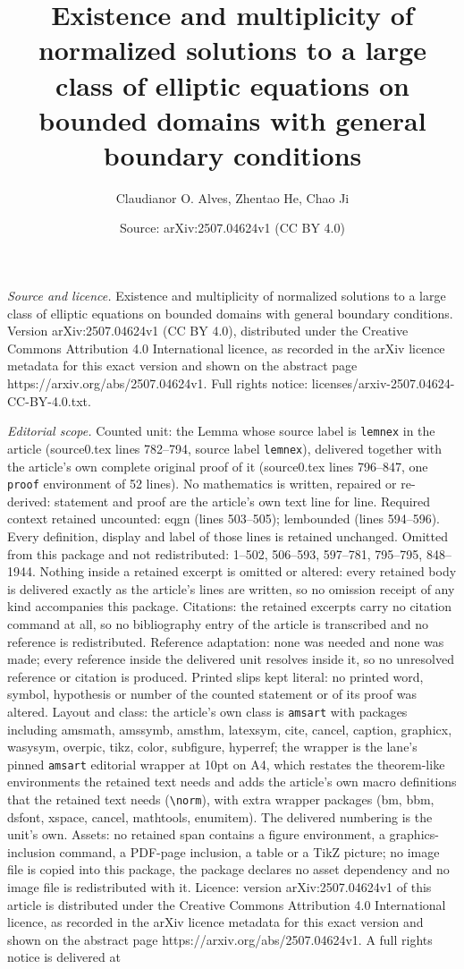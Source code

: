 \documentclass[10pt,a4paper]{amsart}
\title[Existence and multiplicity of normalized solutions to a larg]{Existence and multiplicity of normalized solutions to a large class of elliptic equations on bounded domains with general boundary conditions}
\author{Claudianor O. Alves, Zhentao He, Chao Ji}
\date{Source: arXiv:2507.04624v1 (CC BY 4.0)}
\begin{document}
\maketitle

\noindent\emph{Source and licence.} Existence and multiplicity of normalized solutions to a large class of elliptic equations on bounded domains with general boundary conditions. Version arXiv:2507.04624v1 (CC BY 4.0), distributed under the Creative Commons Attribution 4.0 International licence, as recorded in the arXiv licence metadata for this exact version and shown on the abstract page https://arxiv.org/abs/2507.04624v1. Full rights notice: licenses/arxiv-2507.04624-CC-BY-4.0.txt.\par\smallskip

\noindent\textit{Editorial scope.} Counted unit: the Lemma whose source label is \texttt{lemnex} in the article (source0.tex lines 782--794, source label \texttt{lemnex}), delivered together with the article's own complete original proof of it (source0.tex lines 796--847, one \texttt{proof} environment of 52 lines). No mathematics is written, repaired or re-derived: statement and proof are the article's own text line for line. Required context retained uncounted: eqgn (lines 503--505); lembounded (lines 594--596). Every definition, display and label of those lines is retained unchanged. Omitted from this package and not redistributed: 1--502, 506--593, 597--781, 795--795, 848--1944. Nothing inside a retained excerpt is omitted or altered: every retained body is delivered exactly as the article's lines are written, so no omission receipt of any kind accompanies this package. Citations: the retained excerpts carry no citation command at all, so no bibliography entry of the article is transcribed and no reference is redistributed. Reference adaptation: none was needed and none was made; every reference inside the delivered unit resolves inside it, so no unresolved reference or citation is produced. Printed slips kept literal: no printed word, symbol, hypothesis or number of the counted statement or of its proof was altered. Layout and class: the article's own class is \texttt{amsart} with packages including amsmath, amssymb, amsthm, latexsym, cite, cancel, caption, graphicx, wasysym, overpic, tikz, color, subfigure, hyperref; the wrapper is the lane's pinned \texttt{amsart} editorial wrapper at 10pt on A4, which restates the theorem-like environments the retained text needs and adds the article's own macro definitions that the retained text needs (\texttt{\textbackslash norm}), with extra wrapper packages (bm, bbm, dsfont, xspace, cancel, mathtools, enumitem). The delivered numbering is the unit's own. Assets: no retained span contains a figure environment, a graphics-inclusion command, a PDF-page inclusion, a table or a TikZ picture; no image file is copied into this package, the package declares no asset dependency and no image file is redistributed with it. Licence: version arXiv:2507.04624v1 of this article is distributed under the Creative Commons Attribution 4.0 International licence, as recorded in the arXiv licence metadata for this exact version and shown on the abstract page https://arxiv.org/abs/2507.04624v1. A full rights notice is delivered at 
\end{document}
